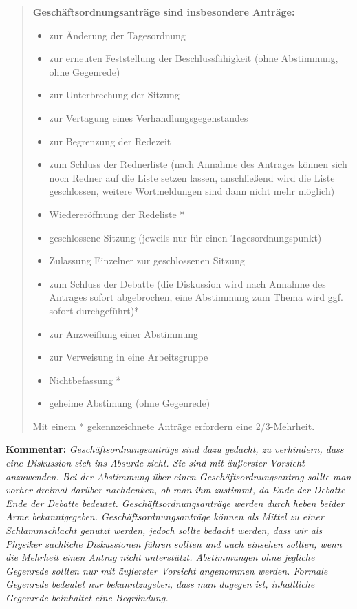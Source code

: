 \begin{enumerate}
\begin{quote}
\textbf{Geschäftsordnungsanträge sind insbesondere Anträge:}
\begin{itemize}
\item{zur Änderung der Tagesordnung}
\item{zur erneuten Feststellung der Beschlussfähigkeit (ohne Abstimmung, ohne Gegenrede)}
\item{zur Unterbrechung der Sitzung}
\item{zur Vertagung eines Verhandlungsgegenstandes}
\item{zur Begrenzung der Redezeit}
\item{zum Schluss der Rednerliste (nach Annahme des Antrages können sich noch Redner auf die Liste
setzen lassen, anschließend wird die Liste geschlossen, weitere Wortmeldungen sind dann nicht
mehr möglich)}
\item{Wiedereröffnung der Redeliste *}
\item{geschlossene Sitzung (jeweils nur für einen Tagesordnungspunkt)}
\item{Zulassung Einzelner zur geschlossenen Sitzung}
\item{zum Schluss der Debatte (die Diskussion wird nach Annahme des Antrages sofort abgebrochen, eine
Abstimmung zum Thema wird ggf. sofort durchgeführt)*}
\item{zur Anzweiflung einer Abstimmung}
\item{zur Verweisung in eine Arbeitsgruppe}
\item{Nichtbefassung *}
\item{geheime Abstimung (ohne Gegenrede)}

\end{itemize}
Mit einem * gekennzeichnete Anträge erfordern eine 2/3-Mehrheit.
\end{quote}
\end{enumerate}
\textbf{Kommentar:} {\footnotesize\textit{Geschäftsordnungsanträge
sind dazu gedacht, zu verhindern, dass eine Diskussion sich ins
Absurde zieht. Sie sind mit äußerster Vorsicht anzuwenden. Bei der
Abstimmung über einen Geschäftsordnungsantrag sollte man vorher
dreimal darüber nachdenken, ob man ihm zustimmt, da Ende der Debatte
Ende der Debatte bedeutet. Geschäftsordnungsanträge werden durch
heben beider Arme bekanntgegeben. Geschäftsordnungsanträge können
als Mittel zu einer Schlammschlacht genutzt werden, jedoch sollte
bedacht werden, dass wir als Physiker sachliche Diskussionen führen
sollten und auch einsehen sollten, wenn die Mehrheit einen Antrag
nicht unterstützt. Abstimmungen ohne jegliche Gegenrede sollten nur
mit äußerster Vorsicht angenommen werden. Formale Gegenrede bedeutet
nur bekanntzugeben, dass man dagegen ist,
inhaltliche Gegenrede beinhaltet eine Begründung.}}\\[1ex]

